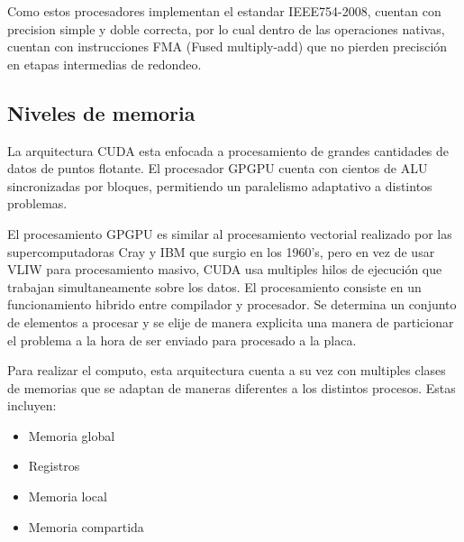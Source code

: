 Como estos procesadores implementan el estandar IEEE754-2008, cuentan con precision simple y
doble correcta, por lo cual dentro de las operaciones nativas, cuentan con instrucciones FMA
(Fused multiply-add) que no pierden precisci\'on en etapas intermedias de redondeo.



\subsection{Niveles de memoria}

La arquitectura CUDA esta enfocada a procesamiento de grandes cantidades de datos
de puntos flotante. El procesador GPGPU cuenta con cientos de ALU sincronizadas
por bloques, permitiendo un paralelismo adaptativo a distintos problemas.

El procesamiento GPGPU es similar al procesamiento vectorial
realizado por las supercomputadoras Cray y IBM que surgio en los 1960's, pero
en vez de usar VLIW para procesamiento masivo, CUDA usa multiples hilos de ejecuci\'on
que trabajan simultaneamente sobre los datos.
El procesamiento consiste en un funcionamiento hibrido entre compilador y procesador. Se determina
un conjunto de elementos a procesar y se elije de manera explicita una manera de particionar el
problema a la hora de ser enviado para procesado a la placa.


Para realizar el computo, esta arquitectura cuenta a su vez con multiples clases de memorias
que se adaptan de maneras diferentes a los distintos procesos. Estas incluyen:

\begin{itemize}
  \item Memoria global
  \item Registros
  \item Memoria local
  \item Memoria compartida
\end{itemize}

